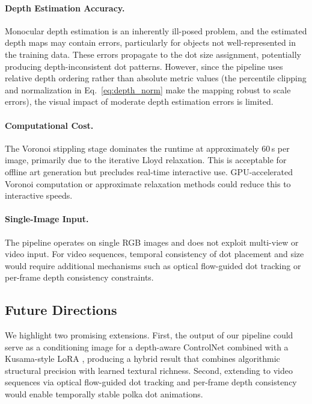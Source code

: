 \paragraph{Depth Estimation Accuracy.}
Monocular depth estimation is an inherently ill-posed problem, and the
estimated depth maps may contain errors, particularly for objects not
well-represented in the training data. These errors propagate to the
dot size assignment, potentially producing depth-inconsistent dot
patterns. However, since the pipeline uses relative depth ordering
rather than absolute metric values (the percentile clipping and
normalization in Eq.~\ref{eq:depth_norm} make the mapping robust to
scale errors), the visual impact of moderate depth estimation errors
is limited.

\paragraph{Computational Cost.}
The Voronoi stippling stage dominates the runtime at approximately
60\,s per image, primarily due to the iterative Lloyd relaxation. This
is acceptable for offline art generation but precludes real-time
interactive use. GPU-accelerated Voronoi computation or approximate
relaxation methods could reduce this to interactive speeds.

\paragraph{Single-Image Input.}
The pipeline operates on single RGB images and does not exploit
multi-view or video input. For video sequences, temporal consistency
of dot placement and size would require additional mechanisms such as
optical flow-guided dot tracking or per-frame depth consistency
constraints.

\subsection{Future Directions}

We highlight two promising extensions.
First, the output of our pipeline could serve as a conditioning
image for a depth-aware ControlNet \citep{zhang2023adding} combined
with a Kusama-style LoRA \citep{hu2022lora}, producing a hybrid
result that combines algorithmic structural precision with learned
textural richness. Second, extending to video sequences via
optical flow-guided dot tracking and per-frame depth consistency
would enable temporally stable polka dot animations.
